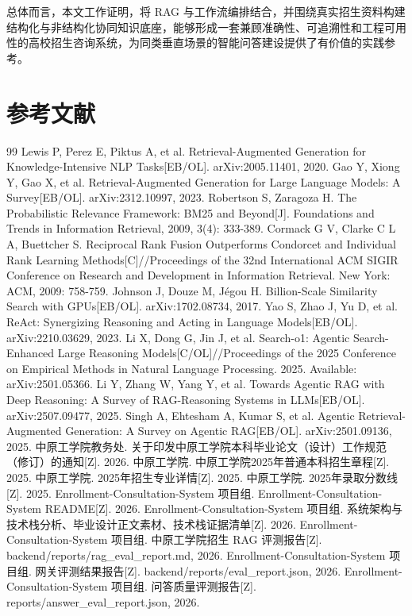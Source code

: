 \documentclass[UTF8,zihao=-4,oneside,fontset=windows]{ctexbook}
\numberwithin{equation}{chapter}
\begin{document}
总体而言，本文工作证明，将 RAG 与工作流编排结合，并围绕真实招生资料构建结构化与非结构化协同知识底座，能够形成一套兼顾准确性、可追溯性和工程可用性的高校招生咨询系统，为同类垂直场景的智能问答建设提供了有价值的实践参考。

\clearpage
\chapter*{参考文献}
{\fontsize{10.5pt}{17pt}\selectfont
\begin{thebibliography}{99}
 Lewis P, Perez E, Piktus A, et al. Retrieval-Augmented Generation for Knowledge-Intensive NLP Tasks[EB/OL]. arXiv:2005.11401, 2020.
 Gao Y, Xiong Y, Gao X, et al. Retrieval-Augmented Generation for Large Language Models: A Survey[EB/OL]. arXiv:2312.10997, 2023.
 Robertson S, Zaragoza H. The Probabilistic Relevance Framework: BM25 and Beyond[J]. Foundations and Trends in Information Retrieval, 2009, 3(4): 333-389.
 Cormack G V, Clarke C L A, Buettcher S. Reciprocal Rank Fusion Outperforms Condorcet and Individual Rank Learning Methods[C]//Proceedings of the 32nd International ACM SIGIR Conference on Research and Development in Information Retrieval. New York: ACM, 2009: 758-759.
 Johnson J, Douze M, J{\'e}gou H. Billion-Scale Similarity Search with GPUs[EB/OL]. arXiv:1702.08734, 2017.
 Yao S, Zhao J, Yu D, et al. ReAct: Synergizing Reasoning and Acting in Language Models[EB/OL]. arXiv:2210.03629, 2023.
 Li X, Dong G, Jin J, et al. Search-o1: Agentic Search-Enhanced Large Reasoning Models[C/OL]//Proceedings of the 2025 Conference on Empirical Methods in Natural Language Processing. 2025. Available: arXiv:2501.05366.
 Li Y, Zhang W, Yang Y, et al. Towards Agentic RAG with Deep Reasoning: A Survey of RAG-Reasoning Systems in LLMs[EB/OL]. arXiv:2507.09477, 2025.
 Singh A, Ehtesham A, Kumar S, et al. Agentic Retrieval-Augmented Generation: A Survey on Agentic RAG[EB/OL]. arXiv:2501.09136, 2025.
 中原工学院教务处. 关于印发中原工学院本科毕业论文（设计）工作规范（修订）的通知[Z]. 2026.
 中原工学院. 中原工学院2025年普通本科招生章程[Z]. 2025.
 中原工学院. 2025年招生专业详情[Z]. 2025.
 中原工学院. 2025年录取分数线[Z]. 2025.
 Enrollment-Consultation-System 项目组. Enrollment-Consultation-System README[Z]. 2026.
 Enrollment-Consultation-System 项目组. 系统架构与技术栈分析、毕业设计正文素材、技术栈证据清单[Z]. 2026.
 Enrollment-Consultation-System 项目组. 中原工学院招生 RAG 评测报告[Z]. backend/reports/rag\_eval\_report.md, 2026.
 Enrollment-Consultation-System 项目组. 网关评测结果报告[Z]. backend/reports/eval\_report.json, 2026.
 Enrollment-Consultation-System 项目组. 问答质量评测报告[Z]. reports/answer\_eval\_report.json, 2026.
\end{thebibliography}
}
\end{document}
